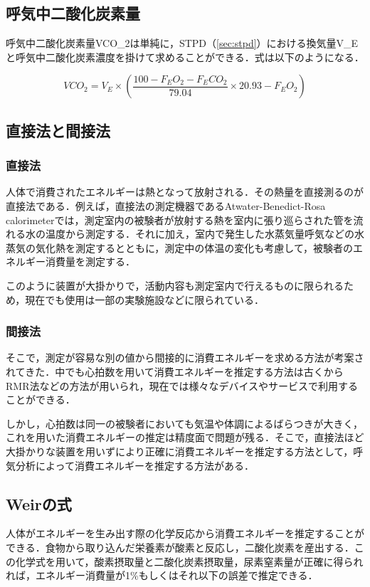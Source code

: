 \subsection{呼気中二酸化炭素量}

呼気中二酸化炭素量VCO_2は単純に，STPD（\ref{sec:stpd}）における換気量V_Eと呼気中二酸化炭素濃度を掛けて求めることができる．式は以下のようになる．

\begin{equation}
  \label{eq:vco2}
  VCO_2 = V_E \times (\frac{100 - F_EO_2 - F_ECO_2}{79.04} \times 20.93 - F_EO_2)
\end{equation}

\subsection{直接法と間接法}

\subsubsection{直接法}

人体で消費されたエネルギーは熱となって放射される．その熱量を直接測るのが直接法である．例えば，直接法の測定機器であるAtwater-Benedict-Rosa calorimeterでは，測定室内の被験者が放射する熱を室内に張り巡らされた管を流れる水の温度から測定する．それに加え，室内で発生した水蒸気量呼気などの水蒸気の気化熱を測定するとともに，測定中の体温の変化も考慮して，被験者のエネルギー消費量を測定する\cite{tanaka_2006}．

このように装置が大掛かりで，活動内容も測定室内で行えるものに限られるため，現在でも使用は一部の実験施設などに限られている．

\subsubsection{間接法}

そこで，測定が容易な別の値から間接的に消費エネルギーを求める方法が考案されてきた．中でも心拍数を用いて消費エネルギーを推定する方法は古くからRMR法などの方法が用いられ\cite{usutani_1990}，現在では様々なデバイスやサービスで利用することができる．

しかし，心拍数は同一の被験者においても気温や体調によるばらつきが大きく，これを用いた消費エネルギーの推定は精度面で問題が残る．そこで，直接法ほど大掛かりな装置を用いずにより正確に消費エネルギーを推定する方法として，呼気分析によって消費エネルギーを推定する方法がある．

\subsection{Weirの式}
人体がエネルギーを生み出す際の化学反応から消費エネルギーを推定することができる．食物から取り込んだ栄養素が酸素と反応し，二酸化炭素を産出する．この化学式を用いて，酸素摂取量と二酸化炭素摂取量，尿素窒素量が正確に得られれば，エネルギー消費量が1\%もしくはそれ以下の誤差で推定できる\cite{livesey_1988}．


